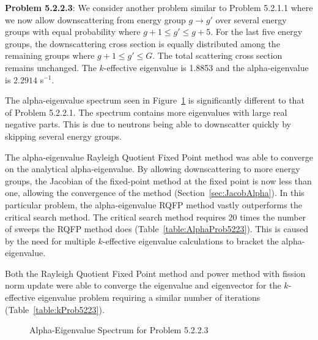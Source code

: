 \textbf{Problem 5.2.2.3}: We consider another problem similar to Problem 5.2.1.1 where we now allow downscattering from energy group $g \rightarrow g'$ over several energy groups with equal probability where $g + 1 \leq g' \leq g+5$. For the last five energy groups, the downscattering cross section is equally distributed among the remaining groups where $g+1 \leq g' \leq G$. The total scattering cross section remains unchanged. The $k$-effective eigenvalue is 1.8853 and the alpha-eigenvalue is $2.2914$ s$^{-1}$.

The alpha-eigenvalue spectrum seen in Figure~\ref{fig:G81P3Spec} is significantly different to that of Problem 5.2.2.1. The spectrum contains more eigenvalues with large real negative parts. This is due to neutrons being able to downscatter quickly by skipping several energy groups.

The alpha-eigenvalue Rayleigh Quotient Fixed Point method was able to converge on the analytical alpha-eigenvalue. By allowing downscattering to more energy groups, the Jacobian of the fixed-point method at the fixed point is now less than one, allowing the convergence of the method (Section~\ref{sec:JacobAlpha}). In this particular problem, the alpha-eigenvalue RQFP method vastly outperforms the critical search method. The critical search method requires 20 times the number of sweeps the RQFP method does (Table~\ref{table:AlphaProb5223}). This is caused by the need for multiple $k$-effective eigenvalue calculations to bracket the alpha-eigenvalue.

Both the Rayleigh Quotient Fixed Point method and power method with fission norm update were able to converge the eigenvalue and eigenvector for the $k$-effective eigenvalue problem requiring a similar number of iterations (Table~\ref{table:kProb5223}). 

\begin{figure}[!htbp]
\centering
	\resizebox{0.90\textwidth}{!}{
	}
\caption{Alpha-Eigenvalue Spectrum for Problem 5.2.2.3}
\label{fig:G81P3Spec}
\end{figure}


